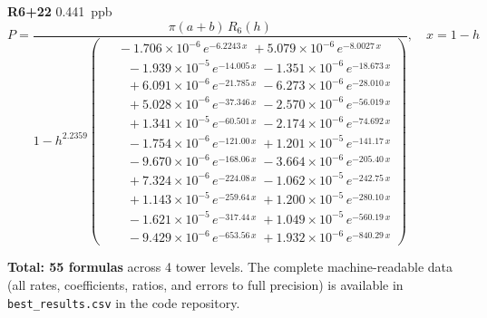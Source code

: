 \documentclass[12pt]{article}
\begin{document}
\noindent\textbf{R6+22} 0.441~ppb\nopagebreak
\begin{equation*}
P = \frac{\pi(a{+}b)\,R_6(h)}{1 - h^{2.2359}\!\left(\!\begin{aligned}
  &\; -1.706{\times}10^{-6}\,e^{-6.2243\,x} \; +5.079{\times}10^{-6}\,e^{-8.0027\,x} \\[-3pt]
  &\quad -1.939{\times}10^{-5}\,e^{-14.005\,x} \; -1.351{\times}10^{-6}\,e^{-18.673\,x} \\[-3pt]
  &\quad +6.091{\times}10^{-6}\,e^{-21.785\,x} \; -6.273{\times}10^{-6}\,e^{-28.010\,x} \\[-3pt]
  &\quad +5.028{\times}10^{-6}\,e^{-37.346\,x} \; -2.570{\times}10^{-6}\,e^{-56.019\,x} \\[-3pt]
  &\quad +1.341{\times}10^{-5}\,e^{-60.501\,x} \; -2.174{\times}10^{-6}\,e^{-74.692\,x} \\[-3pt]
  &\quad -1.754{\times}10^{-6}\,e^{-121.00\,x} \; +1.201{\times}10^{-5}\,e^{-141.17\,x} \\[-3pt]
  &\quad -9.670{\times}10^{-6}\,e^{-168.06\,x} \; -3.664{\times}10^{-6}\,e^{-205.40\,x} \\[-3pt]
  &\quad +7.324{\times}10^{-6}\,e^{-224.08\,x} \; -1.062{\times}10^{-5}\,e^{-242.75\,x} \\[-3pt]
  &\quad +1.143{\times}10^{-5}\,e^{-259.64\,x} \; +1.200{\times}10^{-5}\,e^{-280.10\,x} \\[-3pt]
  &\quad -1.621{\times}10^{-5}\,e^{-317.44\,x} \; +1.049{\times}10^{-5}\,e^{-560.19\,x} \\[-3pt]
  &\quad -9.429{\times}10^{-6}\,e^{-653.56\,x} \; +1.932{\times}10^{-6}\,e^{-840.29\,x}
\end{aligned}\!\right)}, \quad x = 1{-}h
\end{equation*}

\medskip\noindent\textbf{Total: 55 formulas} across 4 tower levels. The complete machine-readable data (all rates, coefficients, ratios, and errors to full precision) is available in \texttt{best\_results.csv} in the code repository.
\end{document}
